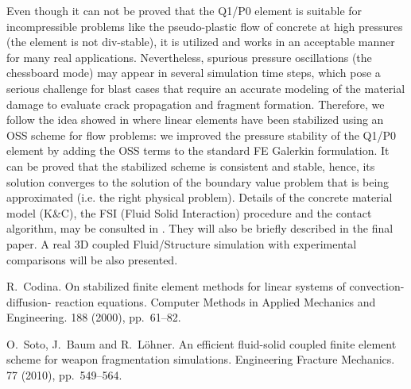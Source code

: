 Even though it can not be
proved that the Q1/P0 element is suitable for incompressible problems like
the pseudo-plastic flow of concrete at high pressures (the element is
not div-stable), it is utilized and works in an acceptable manner for
many real applications. Nevertheless, spurious pressure
oscillations (the chessboard mode) may
appear in several simulation time steps, which
pose a serious challenge for blast cases that require an
accurate modeling of the material damage to evaluate crack propagation and
fragment formation. Therefore, we follow the idea showed in
\cite{ref1} where linear elements have been stabilized using an OSS scheme
for flow problems: we improved the pressure
stability of the Q1/P0 
element by adding the OSS terms to the standard FE
Galerkin formulation. It can be proved that the stabilized scheme is
consistent and stable, hence, its solution converges to the solution of the
boundary value problem that is being approximated (i.e. the right physical
problem). Details of the concrete material model (K\&C), the FSI (Fluid Solid
Interaction) procedure and the contact algorithm, may be consulted in
\cite{ref3}. They will also be briefly described in the final paper. A real 3D
coupled Fluid/Structure simulation with experimental comparisons will be also
presented.


\begin{thebibliography}{10}

{\sc R.~Codina}. {On stabilized finite element methods for linear systems of
  convection-diffusion- reaction equations}. Computer Methods in Applied
Mechanics and Engineering. 188 (2000), pp.~61--82.

{\sc O.~Soto, J.~Baum and R.~L\"ohner}. {An efficient fluid-solid coupled
  finite element scheme for weapon fragmentation simulations}. Engineering
Fracture Mechanics. 77 (2010), pp.~549--564.

\end{thebibliography}

